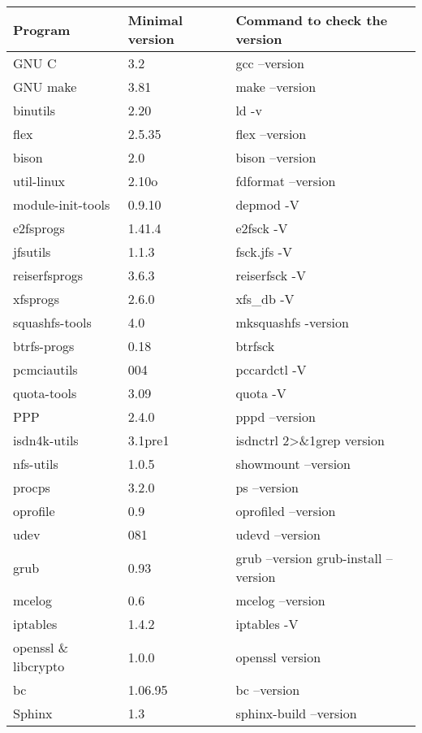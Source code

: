 \documentclass[a4paper,8pt,english]{sphinxmanual}
\begin{document}
\begin{tabulary}{\linewidth}{|L|L|L|}
\hline
\textsf{\relax 
Program
} & \textsf{\relax 
Minimal version
} & \textsf{\relax 
Command to check the version
}\\
\hline
GNU C
 & 
3.2
 & 
gcc --version
\\
\hline
GNU make
 & 
3.81
 & 
make --version
\\
\hline
binutils
 & 
2.20
 & 
ld -v
\\
\hline
flex
 & 
2.5.35
 & 
flex --version
\\
\hline
bison
 & 
2.0
 & 
bison --version
\\
\hline
util-linux
 & 
2.10o
 & 
fdformat --version
\\
\hline
module-init-tools
 & 
0.9.10
 & 
depmod -V
\\
\hline
e2fsprogs
 & 
1.41.4
 & 
e2fsck -V
\\
\hline
jfsutils
 & 
1.1.3
 & 
fsck.jfs -V
\\
\hline
reiserfsprogs
 & 
3.6.3
 & 
reiserfsck -V
\\
\hline
xfsprogs
 & 
2.6.0
 & 
xfs\_db -V
\\
\hline
squashfs-tools
 & 
4.0
 & 
mksquashfs -version
\\
\hline
btrfs-progs
 & 
0.18
 & 
btrfsck
\\
\hline
pcmciautils
 & 
004
 & 
pccardctl -V
\\
\hline
quota-tools
 & 
3.09
 & 
quota -V
\\
\hline
PPP
 & 
2.4.0
 & 
pppd --version
\\
\hline
isdn4k-utils
 & 
3.1pre1
 & 
isdnctrl 2\textgreater{}\&1\textbar{}grep version
\\
\hline
nfs-utils
 & 
1.0.5
 & 
showmount --version
\\
\hline
procps
 & 
3.2.0
 & 
ps --version
\\
\hline
oprofile
 & 
0.9
 & 
oprofiled --version
\\
\hline
udev
 & 
081
 & 
udevd --version
\\
\hline
grub
 & 
0.93
 & 
grub --version \textbar{}\textbar{} grub-install --version
\\
\hline
mcelog
 & 
0.6
 & 
mcelog --version
\\
\hline
iptables
 & 
1.4.2
 & 
iptables -V
\\
\hline
openssl \& libcrypto
 & 
1.0.0
 & 
openssl version
\\
\hline
bc
 & 
1.06.95
 & 
bc --version
\\
\hline
Sphinx\protect\footnotemark[1]
 & 
1.3
 & 
sphinx-build --version
\\
\hline\end{tabulary}
\end{document}
